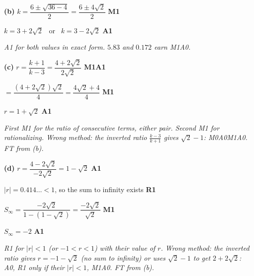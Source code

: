 \documentclass[12pt, twoside]{article}
\begin{document}
\begin{enumerate}[itemsep=0.3cm]
\textbf{(b)} $k = \dfrac{6 \pm \sqrt{36 - 4}}{2} = \dfrac{6 \pm 4\sqrt{2}}{2}$ \hfill \textbf{M1}

$k = 3 + 2\sqrt{2}$ \ or \ $k = 3 - 2\sqrt{2}$ \hfill \textbf{A1}

\emph{A1 for both values in exact form. $5.83$ and $0.172$ earn M1A0.}

\textbf{(c)} $r = \dfrac{k + 1}{k - 3} = \dfrac{4 + 2\sqrt{2}}{2\sqrt{2}}$ \hfill \textbf{M1A1}

$= \dfrac{\left(4 + 2\sqrt{2}\right)\sqrt{2}}{4} = \dfrac{4\sqrt{2} + 4}{4}$ \hfill \textbf{M1}

$r = 1 + \sqrt{2}$ \hfill \textbf{A1}

\emph{First M1 for the ratio of consecutive terms, either pair. Second M1
for rationalizing. Wrong method: the inverted ratio
$\frac{k - 3}{k + 1}$ gives $\sqrt{2} - 1$: M0A0M1A0. FT from (b).}

\textbf{(d)} $r = \dfrac{4 - 2\sqrt{2}}{-2\sqrt{2}} = 1 - \sqrt{2}$ \hfill \textbf{A1}

$|r| = 0.414\ldots < 1$, so the sum to infinity exists \hfill \textbf{R1}

$S_{\infty} = \dfrac{-2\sqrt{2}}{1 - \left(1 - \sqrt{2}\right)} = \dfrac{-2\sqrt{2}}{\sqrt{2}}$ \hfill \textbf{M1}

$S_{\infty} = -2$ \hfill \textbf{A1}

\emph{R1 for $|r| < 1$ (or $-1 < r < 1$) with their value of $r$. Wrong
method: the inverted ratio gives $r = -1 - \sqrt{2}$ (no sum to infinity)
or uses $\sqrt{2} - 1$ to get $2 + 2\sqrt{2}$: A0, R1 only if their
$|r| < 1$, M1A0. FT from (b).}

\end{enumerate}
\end{document}
